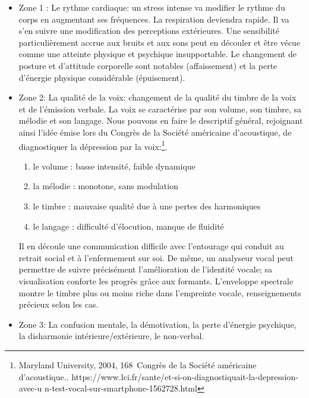 \begin{itemize}
  	\item Zone 1 :  Le rythme cardiaque: un stress intense va modifier le rythme
  du corps en augmentant ses fréquences. La respiration deviendra
  rapide. Il va s'en suivre une modification des perceptions
  extérieures. Une sensibilité particulièrement accrue aux bruits et
  aux sons peut en découler et être vécue comme une
  atteinte physique et psychique insupportable.
  Le changement de posture et d'attitude corporelle sont
notables (affaissement) et la perte d'énergie physique considérable (épuisement).
	\item Zone 2: La qualité de la voix: changement de la qualité du timbre de la
 voix et de l'émission verbale.	
  La voix se caractérise par son volume, son timbre, sa mélodie et son
  langage. Nous pouvons en faire le
        descriptif général, rejoignant ainsi l'idée émise lors du Congrès de la Société
américaine d'acoustique, de diagnostiquer la
        dépression par la voix:\footnote{Maryland University, 2004, 168\ieme\ Congrès de la Société
américaine d'acoustique.\autocite{le_service_metronews}. https://www.lci.fr/sante/et-si-on-diagnostiquait-la-depression-avec-u
n-test-vocal-sur-smartphone-1562728.html}.
          
 	\begin{enumerate}
 		\item le volume : basse intensité, faible dynamique
 		\item la mélodie : monotone, sans modulation
 		\item le timbre : mauvaise qualité due à une pertes des harmoniques
 		\item le langage : difficulté d'élocution, manque de fluidité
 	\end{enumerate}
        Il en découle une communication difficile avec l'entourage qui
        conduit au retrait social et à l'enfermement sur soi.
De même, un analyseur vocal peut permettre de suivre précisément l'amélioration de
l'identité vocale; sa visualisation conforte les progrès grâce aux
formants. L'enveloppe spectrale montre le timbre plus ou moins riche
dans l'empreinte vocale, renseignements précieux selon les cas.
        
	\item Zone 3: La confusion mentale, la démotivation, la perte d'énergie
psychique, la disharmonie intérieure/extérieure, le non-verbal.
\end{itemize}

 

